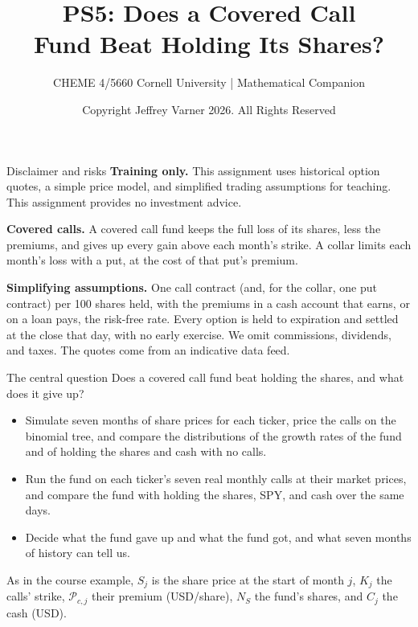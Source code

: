 \documentclass[aspectratio=169,11pt]{beamer}
\title{\texorpdfstring{{\vnheavy PS5}: Does a Covered Call\\Fund Beat Holding Its Shares?}{PS5: Does a Covered Call Fund Beat Holding Its Shares?}}
\subtitle{CHEME 4/5660 Cornell University | Mathematical Companion}
\author{Copyright Jeffrey Varner 2026. All Rights Reserved}
\newcommand{\Prem}{\mathcal{P}}
\begin{document}
\vntitlepage

\begin{frame}{Disclaimer and risks}
\textbf{Training only.} This assignment uses historical option quotes, a
simple price model, and simplified trading assumptions for teaching. This assignment
provides no investment advice.

\vspace{1em}
\textbf{Covered calls.} A covered call fund keeps the full loss of its shares,
less the premiums, and gives up every gain above each month's strike. A collar
limits each month's loss with a put, at the cost of that put's premium.

\vspace{1em}
\textbf{Simplifying assumptions.} One call contract (and, for the collar, one
put contract) per 100 shares held, with the premiums in a cash account that
earns, or on a loan pays, the risk-free rate. Every option is held to expiration and settled at
the close that day, with no early exercise. We omit commissions, dividends,
and taxes. The quotes come from an indicative data feed.
\end{frame}

\begin{frame}{The central question}
Does a covered call fund beat holding the shares, and what does it give up?
\vspace{0.2em}
\begin{itemize}\setlength{\itemsep}{0.15em}
\item {} Simulate seven months of share prices for
each ticker, price the calls on the binomial tree, and compare the
distributions of the growth rates of the fund and of holding the shares and
cash with no calls.
\item {} Run the fund on each ticker's seven real monthly
calls at their market prices, and compare the fund with holding the shares,
SPY, and cash over the same days.
\item {} Decide what the fund gave up and what
the fund got, and what seven months of history can tell us.
\end{itemize}
As in the course example, $S_j$ is the share price at the start of month $j$,
$K_j$ the calls' strike, $\Prem_{c,j}$ their premium (USD/share), $N_S$ the
fund's shares, and $C_j$ the cash (USD).
\end{frame}
\end{document}
